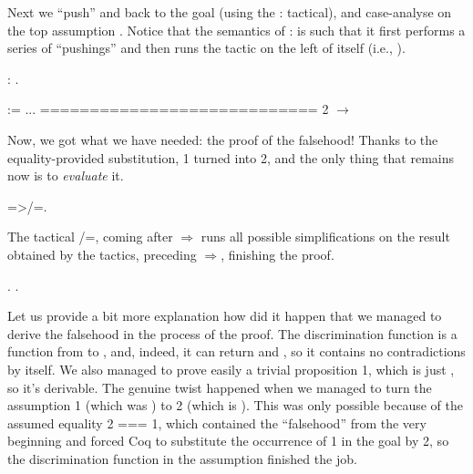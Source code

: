 \coqdocemptyline


Next we ``push''  and  back to the goal (using the : tactical),
and case-analyse on the top assumption . Notice that the semantics
of : \ssrtl{:} is such that it first performs a series of
``pushings'' and then runs the tactic on the left of itself (i.e.,
).


 \begin{coqdoccode}
\coqdocemptyline
\coqdocnoindent
{}:  .\coqdoceol
\coqdocemptyline
\end{coqdoccode}


\coqdoceol
\coqdocemptyline
\coqdocindent{1.00em}
 := ...\coqdoceol
\coqdocindent{1.00em}
============================\coqdoceol
\coqdocindent{1.50em}
 2 \ensuremath{\rightarrow} 

\coqdocemptyline


Now, we got what we have needed: the proof of the falsehood! Thanks to
the equality-provided substitution,  1 turned into  2, and the
only thing that remains now is to \textit{evaluate} it.


\begin{coqdoccode}
\coqdocemptyline
\coqdocnoindent
{}=>/=.\coqdoceol
\coqdocemptyline
\end{coqdoccode}


The tactical \ssrtl{/=}/=, coming after \ensuremath{\Rightarrow} runs all possible
simplifications on the result obtained by the tactics, preceding \ensuremath{\Rightarrow},
finishing the proof.


\begin{coqdoccode}
\coqdocemptyline
\coqdocnoindent
{}.\coqdoceol
\coqdocnoindent
{}.\coqdoceol
\coqdocemptyline
\end{coqdoccode}


Let us provide a bit more explanation how did it happen that we
managed to derive the falsehood in the process of the proof. The
discrimination function  is a function from  to , and,
indeed, it can return  and , so it contains no
contradictions by itself. We also managed to prove easily a trivial
proposition  1, which is just , so it's derivable. The
genuine twist happened when we managed to turn the assumption  1
(which was ) to  2 (which is ). This was only possible
because of the assumed equality 2 === 1, which contained the
``falsehood'' from the very beginning and forced Coq to substitute the
occurrence of 1 in the goal by 2, so the discrimination function
in the assumption finished the job.


